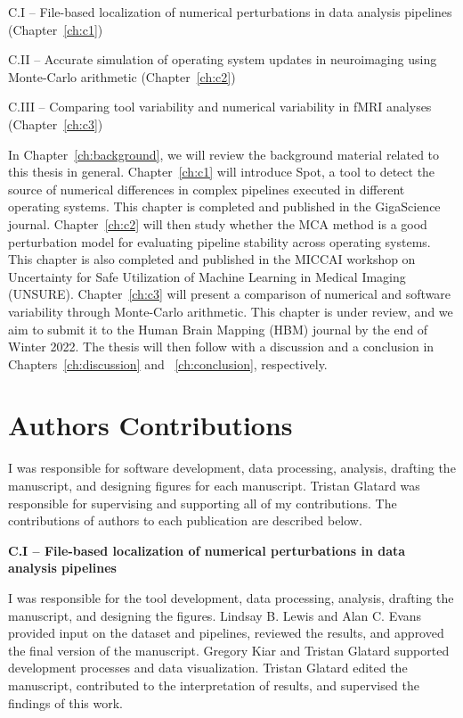 C.I – File-based localization of numerical perturbations in data analysis pipelines (Chapter~\ref{ch:c1})

C.II – Accurate simulation of operating system updates in neuroimaging using Monte-Carlo arithmetic (Chapter~\ref{ch:c2})

C.III – Comparing tool variability and numerical variability in fMRI analyses (Chapter~\ref{ch:c3})


In Chapter~\ref{ch:background}, we will review the background material related to this thesis in general.
Chapter~\ref{ch:c1} will introduce Spot, a tool to detect the source of numerical differences in complex pipelines
executed in different operating systems. This chapter is completed and published in the
GigaScience journal. Chapter~\ref{ch:c2} will then study whether the MCA method is a good perturbation
model for evaluating pipeline stability across operating systems. This chapter is also completed and published
in the MICCAI workshop on Uncertainty for Safe Utilization of Machine Learning in Medical Imaging (UNSURE).
Chapter~\ref{ch:c3} will present a comparison of numerical and software variability through Monte-Carlo arithmetic.
This chapter is under review, and we aim to submit it to the Human Brain Mapping (HBM) journal by the end of Winter 2022.
The thesis will then follow with a discussion and a conclusion in Chapters~\ref{ch:discussion} and ~\ref{ch:conclusion}, respectively.



\section{Authors Contributions}

I was responsible for software development, data processing, analysis, drafting the manuscript, and designing figures for each manuscript. 
Tristan Glatard was responsible for supervising and supporting all of my contributions.
The contributions of authors to each publication are described below.

\textbf{C.I – File-based localization of numerical perturbations in data analysis pipelines}

I was responsible for the tool development, data processing, analysis, drafting the manuscript, and designing the figures.
Lindsay B. Lewis and Alan C. Evans provided input on the dataset and pipelines, reviewed the results, and approved the final version of the manuscript.
Gregory Kiar and Tristan Glatard supported development processes and data visualization.
Tristan Glatard edited the manuscript, contributed to the interpretation of results, and supervised the findings of this work.

